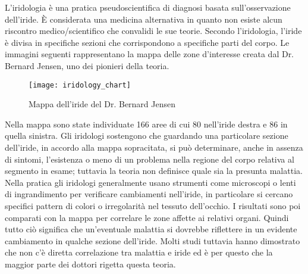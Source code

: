 L’iridologia è una pratica pseudoscientifica di diagnosi basata sull’osservazione dell’iride.  È considerata una medicina alternativa in quanto non esiste alcun riscontro medico/scientifico che convalidi le sue teorie.  Secondo l’iridologia, l’iride è divisa in specifiche sezioni che corrispondono a specifiche parti del corpo. Le immagini seguenti rappresentano la mappa delle zone d’interesse creata dal Dr. Bernard Jensen, uno dei pionieri della teoria.

\begin{figure}[h]
  \centering
  \texttt{[image: iridology\_chart]}
  \caption{Mappa dell'iride del Dr. Bernard Jensen}
\end{figure}

Nella mappa sono state individuate 166 aree di cui 80 nell’iride destra e 86 in quella sinistra. Gli iridologi sostengono che guardando una particolare sezione dell’iride, in accordo alla mappa sopracitata, si può determinare, anche in assenza di sintomi, l’esistenza o meno di un problema nella regione del corpo relativa al segmento in esame; tuttavia la teoria non definisce quale sia la presunta malattia. Nella pratica gli iridologi generalmente usano strumenti come microscopi o lenti di ingrandimento per verificare cambiamenti nell’iride, in particolare si cercano specifici pattern di colori o irregolarità nel tessuto dell’occhio. I risultati sono poi comparati con la mappa per correlare le zone affette ai relativi organi. Quindi tutto ciò significa che un’eventuale malattia si dovrebbe riflettere in un evidente cambiamento in qualche sezione dell’iride. Molti studi tuttavia hanno dimostrato che non c’è diretta correlazione tra malattia e iride ed è per questo che la maggior parte dei dottori rigetta questa teoria. 
